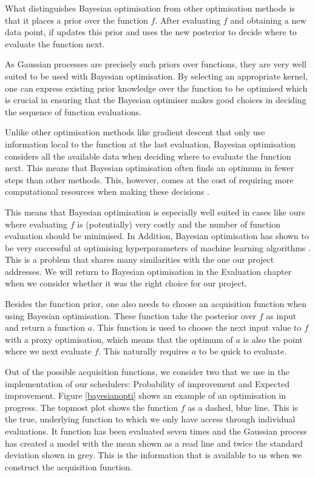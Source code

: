 \documentclass[a4paper,12pt,twoside,openright]{report}
\begin{document}
What distinguishes Bayesian optimisation from other optimisation methods is that it places a prior over the function $f$. After evaluating $f$ and obtaining a new data point, if updates this prior and uses the new posterior to decide where to evaluate the function next.

As Gaussian processes are precisely such priors over functions, they are very well suited to be used with Bayesian optimisation. By selecting an appropriate kernel, one can express existing prior knowledge over the function to be optimised which is crucial in ensuring that the Bayesian optimiser makes good choices in deciding the sequence of function evaluations.

Unlike other optimisation methods like gradient descent that only use information local to the function at the last evaluation, Bayesian optimisation considers all the available data when deciding where to evaluate the function next. This means that Bayesian optimisation often finds an optimum in fewer steps than other methods. This, however, comes at the cost of requiring more computational resources when making these decisions \cite{PracticalBayesianOptimization}.

This means that Bayesian optimisation is especially well suited in cases like ours where evaluating $f$ is (potentially) very costly and the number of function evaluation should be minimised. In Addition, Bayesian optimisation has shown to be very successful at optimising hyperparameters of machine learning algorithms \cite{PracticalBayesianOptimization}. This is a problem that shares many similarities with the one our project addresses. We will return to Bayesian optimisation in the Evaluation chapter when we consider whether it was the right choice for our project.

Besides the function prior, one also needs to choose an acquisition function when using Bayesian optimisation. These function take the posterior over $f$ as input and return a function $a$. This function is used to choose the next input value to $f$ with a proxy optimisation, which means that the optimum of $a$ is also the point where we next evaluate $f$. This naturally requires $a$ to be quick to evaluate.

Out of the possible acquisition functions, we consider two that we use in the implementation of our schedulers: Probability of improvement and Expected improvement. Figure \ref{bayesianopti} shows an example of an optimisation in progress. The topmost plot shows the function $f$ as a dashed, blue line. This is the true, underlying function to which we only have access through individual evaluations. It function has been evaluated seven times and the Gaussian process has created a model with the mean shown as a read line and twice the standard deviation shown in grey. This is the information that is available to us when we construct the acquisition function.
\end{document}
